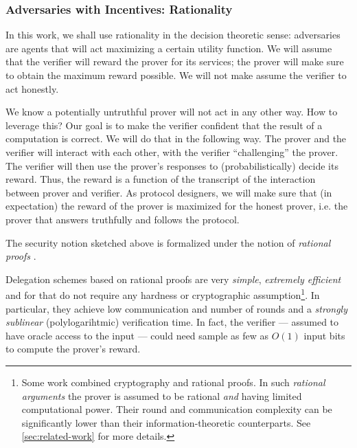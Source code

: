 \subsubsection{Adversaries with Incentives: Rationality}


In this work, we shall use rationality in the decision theoretic sense:
adversaries are agents that will act maximizing a certain utility function.
We will assume that the verifier will reward the prover for its services;
the prover will make sure to obtain the maximum reward possible.
We will not make assume the verifier to act honestly.

We know a potentially untruthful prover will not act in any other way. How to leverage this?
Our goal is to make the verifier confident that the result of a computation is correct.
We will do that in the following way.
The prover and the verifier will interact with each other, with
the verifier ``challenging'' the prover.
The verifier will then use the prover's responses to (probabilistically) decide its reward.
Thus, the reward is a function of the transcript of the interaction between prover and verifier.
As protocol designers, we will make sure that (in expectation) the reward of the prover is maximized
for the honest prover, i.e. the prover that answers truthfully and follows the protocol.

The security notion sketched above is formalized under the notion of \textit{rational proofs} \CN.

Delegation schemes based on rational proofs are very \textit{simple}, \textit{extremely efficient}
and for that do not require any hardness or cryptographic assumption\footnote{Some work \CN combined cryptography and rational proofs. In such \textit{rational arguments} the prover is assumed to be rational \textit{and} having limited computational power. Their round and communication complexity can be significantly lower than their information-theoretic counterparts. See \ref{sec:related-work} \XXX for more details. }. 
In particular, they achieve low communication and number of rounds and a \textit{strongly sublinear} (polylogarihtmic) verification time. In fact, the verifier --- assumed to have oracle access to the input --- could need sample as few as $O(1)$ input bits to compute the prover's reward.


